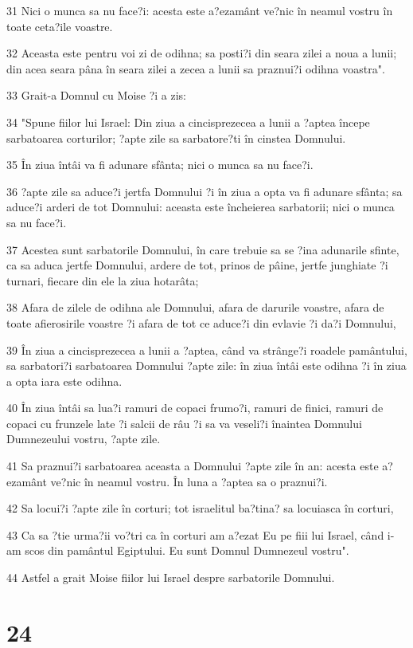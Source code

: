 \par 31 Nici o munca sa nu face?i: acesta este a?ezamânt ve?nic în neamul vostru în toate ceta?ile voastre.
\par 32 Aceasta este pentru voi zi de odihna; sa posti?i din seara zilei a noua a lunii; din acea seara pâna în seara zilei a zecea a lunii sa praznui?i odihna voastra".
\par 33 Grait-a Domnul cu Moise ?i a zis:
\par 34 "Spune fiilor lui Israel: Din ziua a cincisprezecea a lunii a ?aptea începe sarbatoarea corturilor; ?apte zile sa sarbatore?ti în cinstea Domnului.
\par 35 În ziua întâi va fi adunare sfânta; nici o munca sa nu face?i.
\par 36 ?apte zile sa aduce?i jertfa Domnului ?i în ziua a opta va fi adunare sfânta; sa aduce?i arderi de tot Domnului: aceasta este încheierea sarbatorii; nici o munca sa nu face?i.
\par 37 Acestea sunt sarbatorile Domnului, în care trebuie sa se ?ina adunarile sfinte, ca sa aduca jertfe Domnului, ardere de tot, prinos de pâine, jertfe junghiate ?i turnari, fiecare din ele la ziua hotarâta;
\par 38 Afara de zilele de odihna ale Domnului, afara de darurile voastre, afara de toate afierosirile voastre ?i afara de tot ce aduce?i din evlavie ?i da?i Domnului,
\par 39 În ziua a cincisprezecea a lunii a ?aptea, când va strânge?i roadele pamântului, sa sarbatori?i sarbatoarea Domnului ?apte zile: în ziua întâi este odihna ?i în ziua a opta iara este odihna.
\par 40 În ziua întâi sa lua?i ramuri de copaci frumo?i, ramuri de finici, ramuri de copaci cu frunzele late ?i salcii de râu ?i sa va veseli?i înaintea Domnului Dumnezeului vostru, ?apte zile.
\par 41 Sa praznui?i sarbatoarea aceasta a Domnului ?apte zile în an: acesta este a?ezamânt ve?nic în neamul vostru. În luna a ?aptea sa o praznui?i.
\par 42 Sa locui?i ?apte zile în corturi; tot israelitul ba?tina? sa locuiasca în corturi,
\par 43 Ca sa ?tie urma?ii vo?tri ca în corturi am a?ezat Eu pe fiii lui Israel, când i-am scos din pamântul Egiptului. Eu sunt Domnul Dumnezeul vostru".
\par 44 Astfel a grait Moise fiilor lui Israel despre sarbatorile Domnului.

\chapter{24}


